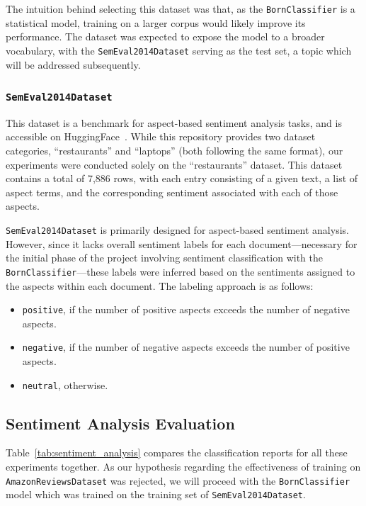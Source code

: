 The intuition behind selecting this dataset was that, as the \texttt{BornClassifier} is a statistical model, training on a larger corpus would likely improve its performance. The dataset was expected to expose the model to a broader vocabulary, with the \texttt{SemEval2014Dataset} serving as the test set, a topic which will be addressed subsequently.

\subsubsection{\texttt{SemEval2014Dataset}}

This dataset is a benchmark for aspect-based sentiment analysis tasks, and is accessible on HuggingFace~\cite{semeval2014_dataset}. While this repository provides two dataset categories, ``restaurants'' and ``laptops'' (both following the same format), our experiments were conducted solely on the ``restaurants'' dataset. This dataset contains a total of 7,886 rows, with each entry consisting of a given text, a list of aspect terms, and the corresponding sentiment associated with each of those aspects.

\texttt{SemEval2014Dataset} is primarily designed for aspect-based sentiment analysis. However, since it lacks overall sentiment labels for each document—necessary for the initial phase of the project involving sentiment classification with the \texttt{BornClassifier}—these labels were inferred based on the sentiments assigned to the aspects within each document. The labeling approach is as follows:

\begin{itemize}
    \item \texttt{positive}, if the number of positive aspects exceeds the number of negative aspects.
    \item \texttt{negative}, if the number of negative aspects exceeds the number of positive aspects.
    \item \texttt{neutral}, otherwise.
\end{itemize}

\subsection{Sentiment Analysis Evaluation}\label{sec:results_sentiment_analysis}

Table~\ref{tab:sentiment_analysis} compares the classification reports for all these experiments together. As our hypothesis regarding the effectiveness of training on \texttt{AmazonReviewsDataset} was rejected, we will proceed with the \texttt{BornClassifier} model which was trained on the training set of \texttt{SemEval2014Dataset}.

